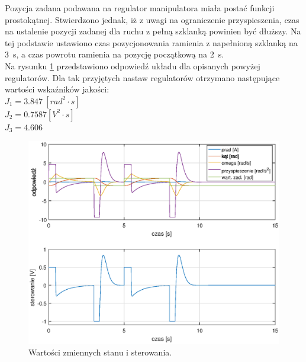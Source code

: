 Pozycja zadana podawana na regulator manipulatora miała postać funkcji prostokątnej. Stwierdzono jednak, iż z uwagi na ograniczenie przyspieszenia, czas na ustalenie pozycji zadanej dla ruchu z pełną szklanką powinien być dłuższy. Na tej podstawie ustawiono czas pozycjonowania ramienia z napełnioną szklanką na 3~s, a czas powrotu ramienia na pozycję początkową na 2~s.\\
Na rysunku \ref{pid_res} przedstawiono odpowied\'z układu dla opisanych powyżej regulatorów.
Dla tak przyjętych nastaw regulatorów otrzymano następujące wartości wska\'zników jakości:\\
\newline
$J_1 = 3.847 \ [rad^2 \cdot s]$\\
$J_2 = 0.7587 [V^2 \cdot s]$\\
$J_3 = 4.606$\\
\begin{figure}[h]
	\centering
	\includegraphics[scale = 0.9]{fig/pid_response.eps}
	\caption		
	{Wartości zmiennych stanu i sterowania.}
	\label{pid_res}
\end{figure} 